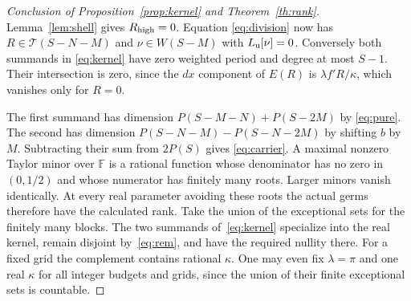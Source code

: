 \begin{proof}[Conclusion of Proposition~\ref{prop:kernel} and Theorem~\ref{th:rank}]
Lemma~\ref{lem:shell} gives $R_{\rm high}=0$. Equation \eqref{eq:division} now has $R\in\mathcal T(S-N-M)$ and $\nu\in W(S-M)$ with $L_{\mathrm u}[\nu]=0$. Conversely both summands in \eqref{eq:kernel} have zero weighted period and degree at most $S-1$. Their intersection is zero, since the $dx$ component of $E(R)$ is $\lambda f'R/\kappa$, which vanishes only for $R=0$.

The first summand has dimension $P(S-M-N)+P(S-2M)$ by \eqref{eq:pure}. The second has dimension $P(S-N-M)-P(S-N-2M)$ by shifting $b$ by $M$. Subtracting their sum from $2P(S)$ gives \eqref{eq:carrier}. A maximal nonzero Taylor minor over $\mathbb F$ is a rational function whose denominator has no zero in $(0,1/2)$ and whose numerator has finitely many roots. Larger minors vanish identically. At every real parameter avoiding these roots the actual germs therefore have the calculated rank. Take the union of the exceptional sets for the finitely many blocks. The two summands of~\eqref{eq:kernel} specialize into the real kernel, remain disjoint by~\eqref{eq:rem}, and have the required nullity there. For a fixed grid the complement contains rational \(\kappa\). One may even fix \(\lambda=\pi\) and one real \(\kappa\) for all integer budgets and grids, since the union of their finite exceptional sets is countable.
\end{proof}
